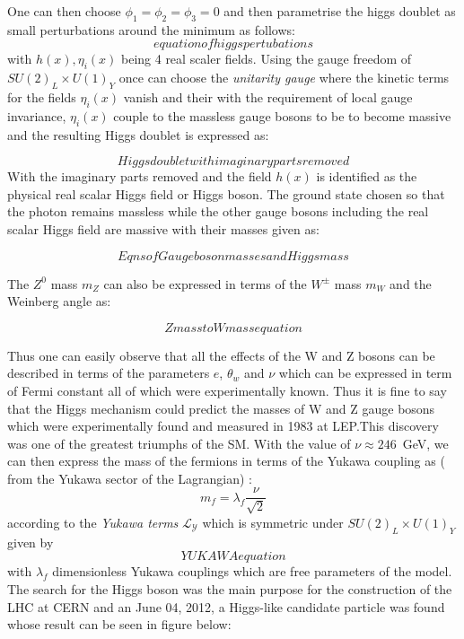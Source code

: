 One can then choose $\phi_{1} = \phi_{2}= \phi_{3} = 0$ and then parametrise the higgs doublet as small perturbations around the minimum as follows:
\begin{equation}
equation of higgs pertubations
\end{equation}
with $h(x), \eta_{i}(x)$ being 4 real scaler fields. Using the gauge freedom of $SU(2)_{L} \times U(1)_{Y}$ once can choose the \textit{unitarity gauge} where the kinetic terms for the fields $\eta_{i}(x)$ vanish and their with the requirement of local gauge invariance, $\eta_{i}(x)$ couple to the massless gauge bosons to be to become massive and the resulting Higgs doublet is expressed as:

\begin{equation}
Higgs doublet with imaginary parts removed
\end{equation}
With the imaginary parts removed and the  field $h(x)$ is identified as the physical real scalar Higgs field or Higgs boson.
The ground state chosen so that the photon remains massless while the other gauge bosons including the real scalar Higgs field are massive with their masses given as:

\begin{equation}
Eqns of Gauge boson masses and Higgs mass
\end{equation}

The $Z^{0}$ mass $m_{Z}$ can also be expressed in terms of the $W^{\pm}$ mass $m_{W}$ and the Weinberg angle as:

\begin{equation}
 Z mass to W mass equation
\end{equation}

Thus one can easily observe that all the effects of the W and Z bosons can be described in terms of the parameters $e$, $\theta_{w}$ and $\nu$ which can be expressed in term of Fermi constant all of which were experimentally known. Thus it is fine to say that the Higgs mechanism could predict the masses of W and Z gauge bosons which were experimentally found and measured in 1983 at LEP\cite{}.This discovery was one of the greatest triumphs of the SM.
With the value of $\nu \approx 246$~GeV, we can then express the mass of the fermions in terms of the Yukawa coupling as ( from the Yukawa sector of the Lagrangian) :
\begin{equation}
m_{f} = \lambda_{f}\frac{\nu}{\sqrt{2}}
\end{equation} 
according to the \textit{Yukawa terms} $\mathcal{L_{Y}}$  which is symmetric under $SU(2)_{L} \times U(1)_{Y}$ given  by
\begin{equation}
 YUKAWA equation
\end{equation}
with $\lambda_{f}$ dimensionless Yukawa couplings which are free parameters of the model.
\newline
The search for the Higgs boson was the main purpose for the construction of the LHC at CERN and an June 04, 2012, a Higgs-like candidate particle was found whose result can be seen in figure below:

